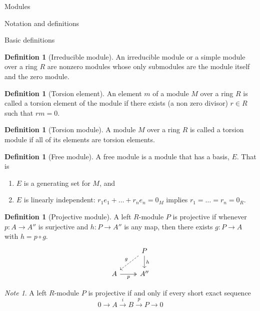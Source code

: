 \documentclass{article}
\theoremstyle{definition}
\numberwithin{theorem}{subsection} %
\theoremstyle{remark}
\newtheorem*{remark}{Note}
\theoremstyle{definition}
\newtheorem{definition}[paragraph]{Definition}
\newcommand{\fn}[3]{{#1 \colon #2 \rightarrow #3}}
\begin{document}
\pagebreak
\begin{section}{Modules}
  \begin{subsection}{Notation and definitions}
    \begin{subsubsection}{Basic definitions}
      \begin{definition}[Irreducible module]
        An irreducible module or a simple module over a ring $R$ are
        nonzero modules whose only submodules are the module itself and the zero
        module.
      \end{definition}
      \begin{definition}[Torsion element]
        An element $m$ of a module $M$ over a ring $R$ is called a torsion element
        of the module if there exists (a non zero divisor) $r \in R$ such that
        $rm = 0$.
      \end{definition}
      \begin{definition}[Torsion module]
        A module $M$ over a ring $R$ is called a torsion module if all of its
        elements are torsion elements.
      \end{definition}
      \begin{definition}[Free module]
        A free module is a module that has a basis, $E$. That is \begin{enumerate}
          \item $E$ is a generating set for $M$, and
          \item $E$ is linearly independent: $r_1e_1 + \hdots + r_ne_n = 0_M$
          implies $r_1 = \hdots = r_n = 0_R$.
        \end{enumerate}
      \end{definition}
      \begin{definition}[Projective module]
        A left $R$-module $P$ is projective if whenever $\fn p A {A''}$ is
        surjective and $\fn h P {A''}$ is any map, then there exists $\fn g P A$
        with $h = p \circ g$. \[
          \begin{tikzcd}
            & P \arrow[dl, dashrightarrow, "g", swap] \arrow[d, "h"] \\
            A \arrow[r, twoheadrightarrow, "p", swap] & A''
          \end{tikzcd}
        \]
      \end{definition}
      \begin{remark}
        A left $R$-module $P$ is projective if and only if every short exact
        sequence \[
          0 \rightarrow A \xrightarrow{i} B  \xrightarrow{p} P \longrightarrow 0
\]
\end{remark}
\end{subsubsection}
\end{subsection}
\end{section}
\end{document}
